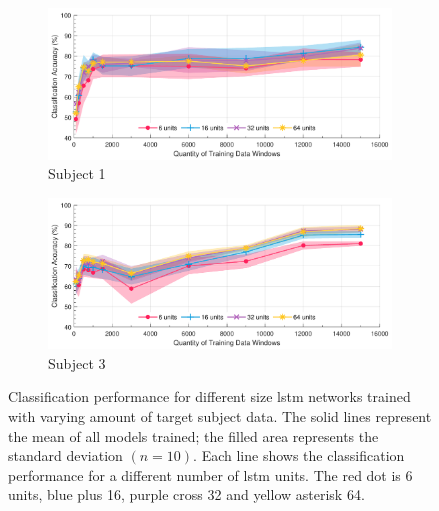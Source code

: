 \begin{figure}[p]
    \centering
    \begin{subfigure}[b]{\textwidth}
        \centering
        \includegraphics[width=\textwidth]{content/5-Personalisation/Bespoke_Target/ch5_bespoke_target_model_subject_1.pdf}
        \caption{Subject 1}
        \label{fig:ch5_6_unit_bespoke_model}
    \end{subfigure}
    \begin{subfigure}[b]{\textwidth}
        \centering
        \includegraphics[width=\textwidth]{content/5-Personalisation/Bespoke_Target/ch5_bespoke_target_model_subject_3.pdf}
        \caption{Subject 3}
        \label{fig:ch5_16_unit_bespoke_model}
    \end{subfigure}
    \caption[ accuracy for training with varying amount of target data]{Classification performance for different size \acrshort{lstm} networks trained with varying amount of target subject data. The solid lines represent the mean of all models trained; the filled area represents the standard deviation $(n=10)$. Each line shows the classification performance for a different number of \acrshort{lstm} units. The red dot is 6 units, blue plus 16, purple cross 32 and yellow asterisk 64.
    }
    \label{fig:ch5_bespoke_mode_classification}
\end{figure}
